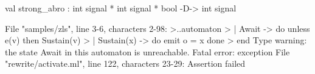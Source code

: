 \chklistingfalse
{}
\begin{ChkListingMsg}
val strong_abro : int signal * int signal * bool -D-> int signal
\end{ChkListingMsg}
\begin{ChkListingErr}
File "samples/zls", line 3-6, characters 2-98:
>..automaton
>  | Await -> do unless e(v) then Sustain(v)
>  | Sustain(x) -> do emit o = x done
>  end
Type warning: the state Await in this automaton is unreachable.
Fatal error: exception File "rewrite/activate.ml", line 122, characters 23-29: Assertion failed
\end{ChkListingErr}
